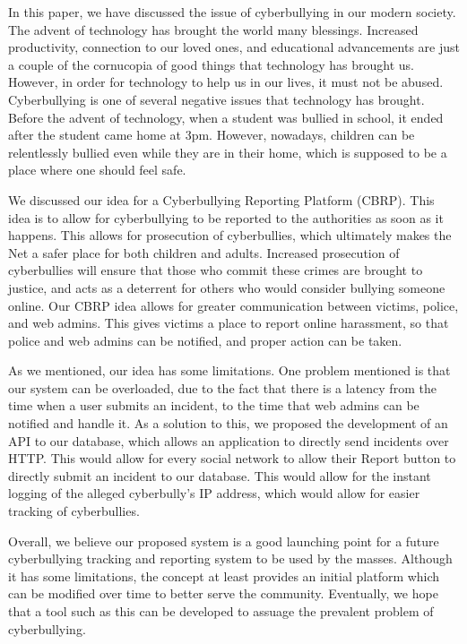 	In this paper, we have discussed the issue of cyberbullying in our modern society. The advent of technology has brought the world many blessings. Increased productivity, connection to our loved ones, and educational advancements are just a couple of the cornucopia of good things that technology has brought us. However, in order for technology to help us in our lives, it must not be abused. Cyberbullying is one of several negative issues that technology has brought. Before the advent of technology, when a student was bullied in school, it ended after the student came home at 3pm. However, nowadays, children can be relentlessly bullied even while they are in their home, which is supposed to be a place where one should feel safe.
	
	We discussed our idea for a Cyberbullying Reporting Platform (CBRP). This idea is to allow for cyberbullying to be reported to the authorities as soon as it happens. This allows for prosecution of cyberbullies, which ultimately makes the Net a safer place for both children and adults. Increased prosecution of cyberbullies will ensure that those who commit these crimes are brought to justice, and acts as a deterrent for others who would consider bullying someone online. Our CBRP idea allows for greater communication between victims, police, and web admins. This gives victims a place to report online harassment, so that police and web admins can be notified, and proper action can be taken.
	
	As we mentioned, our idea has some limitations. One problem mentioned is that our system can be overloaded, due to the fact that there is a latency from the time when a user submits an incident, to the time that web admins can be notified and handle it. As a solution to this, we proposed the development of an API to our database, which allows an application to directly send incidents over HTTP. This would allow for every social network to allow their Report button to directly submit an incident to our database. This would allow for the instant logging of the alleged cyberbully's IP address, which would allow for easier tracking of cyberbullies.
	
	Overall, we believe our proposed system is a good launching point for a future cyberbullying tracking and reporting system to be used by the masses. Although it has some limitations, the concept at least provides an initial platform which can be modified over time to better serve the community. Eventually, we hope that a tool such as this can be developed to assuage the prevalent problem of cyberbullying.